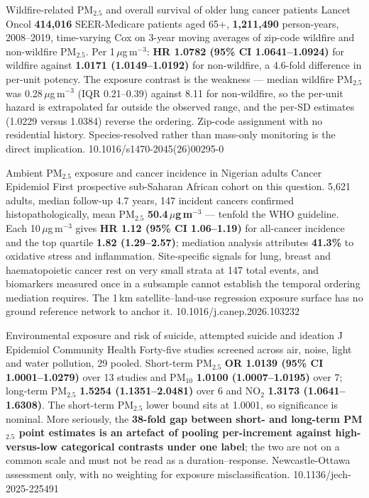 \documentclass[10pt]{article}
\begin{document}

{Wildfire-related PM$_{2.5}$ and overall survival of older lung cancer patients}
{Lancet Oncol}
{\textbf{414{,}016} SEER-Medicare patients aged 65+, \textbf{1{,}211{,}490} person-years,
2008--2019, time-varying Cox on 3-year moving averages of zip-code wildfire and
non-wildfire PM$_{2.5}$. Per 1\,$\mu$g\,m$^{-3}$: \textbf{HR 1.0782 (95\% CI
1.0641--1.0924)} for wildfire against \textbf{1.0171 (1.0149--1.0192)} for non-wildfire,
a 4.6-fold difference in per-unit potency. The exposure contrast is the weakness --- median
wildfire PM$_{2.5}$ was 0.28\,$\mu$g\,m$^{-3}$ (IQR 0.21--0.39) against 8.11 for
non-wildfire, so the per-unit hazard is extrapolated far outside the observed range, and
the per-SD estimates (1.0229 versus 1.0384) reverse the ordering. Zip-code assignment with
no residential history. Species-resolved rather than mass-only monitoring is the direct
implication.}
{10.1016/s1470-2045(26)00295-0}

{Ambient PM$_{2.5}$ exposure and cancer incidence in Nigerian adults}
{Cancer Epidemiol}
{First prospective sub-Saharan African cohort on this question. 5{,}621 adults, median
follow-up 4.7 years, 147 incident cancers confirmed histopathologically, mean PM$_{2.5}$
\textbf{50.4\,$\mu$g\,m$^{-3}$} --- tenfold the WHO guideline. Each 10\,$\mu$g\,m$^{-3}$
gives \textbf{HR 1.12 (95\% CI 1.06--1.19)} for all-cancer incidence and the top quartile
\textbf{1.82 (1.29--2.57)}; mediation analysis attributes \textbf{41.3\%} to oxidative
stress and inflammation. Site-specific signals for lung, breast and haematopoietic cancer
rest on very small strata at 147 total events, and biomarkers measured once in a subsample
cannot establish the temporal ordering mediation requires. The 1\,km satellite--land-use
regression exposure surface has no ground reference network to anchor it.}
{10.1016/j.canep.2026.103232}

\clearpage


{Environmental exposure and risk of suicide, attempted suicide and ideation}
{J Epidemiol Community Health}
{Forty-five studies screened across air, noise, light and water pollution, 29 pooled.
Short-term PM$_{2.5}$ \textbf{OR 1.0139 (95\% CI 1.0001--1.0279)} over 13 studies and
PM$_{10}$ \textbf{1.0100 (1.0007--1.0195)} over 7; long-term PM$_{2.5}$ \textbf{1.5254
(1.1351--2.0481)} over 6 and NO$_2$ \textbf{1.3173 (1.0641--1.6308)}. The short-term
PM$_{2.5}$ lower bound sits at 1.0001, so significance is nominal. More seriously, the
\textbf{38-fold gap between short- and long-term PM$_{2.5}$ point estimates is an artefact
of pooling per-increment against high-versus-low categorical contrasts under one label};
the two are not on a common scale and must not be read as a duration--response.
Newcastle-Ottawa assessment only, with no weighting for exposure misclassification.}
{10.1136/jech-2025-225491}
\end{document}
